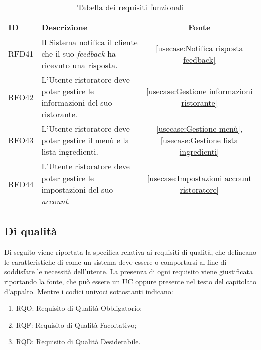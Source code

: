 \begin{table}[H]
	\renewcommand{\arraystretch}{1.5}
	\centering
	\begin{tabularx}{\textwidth}{l|X|c}
		\textbf{ID} & \textbf{Descrizione}                                                                  & \textbf{Fonte}                                                                \\
		\hline
		RFD41       & Il Sistema notifica il cliente che il suo \textit{feedback} ha ricevuto una risposta. & \autoref{usecase:Notifica risposta feedback}                                  \\
		\hline
		RFO42       & L'Utente ristoratore deve poter gestire le informazioni del suo ristorante.           & \autoref{usecase:Gestione informazioni ristorante}                            \\
		\hline
		RFO43       & L'Utente ristoratore deve poter gestire il menù e la lista ingredienti.               & \autoref{usecase:Gestione menù}, \autoref{usecase:Gestione lista ingredienti} \\
		\hline
		RFD44       & L'Utente ristoratore deve poter gestire le impostazioni del suo \textit{account}.     & \autoref{usecase:Impostazioni account ristoratore}                            \\
		\hline
	\end{tabularx}
	\caption{Tabella dei requisiti funzionali}
\end{table}


\subsection{Di qualità}

Di seguito viene riportata la specifica relativa ai requisiti di qualità, che delineano le caratteristiche di come un sistema
deve essere o comportarsi al fine di soddisfare le necessità dell'utente.
La presenza di ogni requisito viene giustificata riportando la fonte, che può essere un UC oppure presente
nel testo del capitolato d'appalto. Mentre i codici univoci sottostanti indicano:
\begin{enumerate}
	\item RQO: Requisito di Qualità Obbligatorio;
	\item RQF: Requisito di Qualità Facoltativo;
	\item RQD: Requisito di Qualità Desiderabile.
\end{enumerate}

